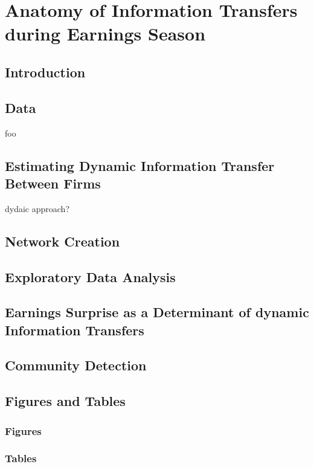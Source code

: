 \chapter{Anatomy of Information Transfers during Earnings Season}


\section{Introduction}


\section{Data}
foo

\section{Estimating Dynamic Information Transfer Between Firms}
dydaic approach?

\section{Network Creation}

\section{Exploratory Data Analysis}

\section{Earnings Surprise as a Determinant of dynamic Information Transfers} %


\section{Community Detection}


\section{Figures and Tables}
\subsection{Figures}
\subsection{Tables}
\clearpage

